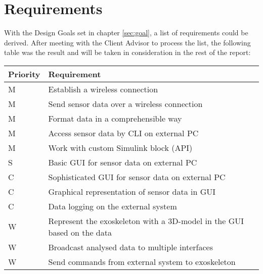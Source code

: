 \section{Requirements}
With the Design Goals set in chapter \ref{sec:goal}, a list of requirements could be derived. After meeting with the Client Advisor to process the list, the following table was the result and will be taken in consideration in the rest of the report:

{\renewcommand{\arraystretch}{1.5}
	\centering
	\begin{tabular}{ | l | l | }
		\hline
		\bfseries{Priority} & \bfseries{Requirement} \\ \hline
		M & Establish a wireless connection \\ \hline
		M & Send sensor data over a wireless connection \\ \hline
		M & Format data in a comprehensible way \\ \hline
		M & Access sensor data by CLI on external PC \\ \hline
		M & Work with custom Simulink block (API) \\ \hline
		S & Basic GUI for sensor data on external PC \\ \hline
		C & Sophisticated GUI for sensor data on external PC\\ \hline
		C & Graphical representation of sensor data in GUI\\ \hline
		C & Data logging on the external system \\ \hline
		W & Represent the exoskeleton with a 3D-model in the GUI based on the data \\ \hline
		W & Broadcast analysed data to multiple interfaces \\ \hline 
		W & Send commands from external system to exoskeleton \\ \hline 
	\end{tabular}
	\label{table:requi}
}